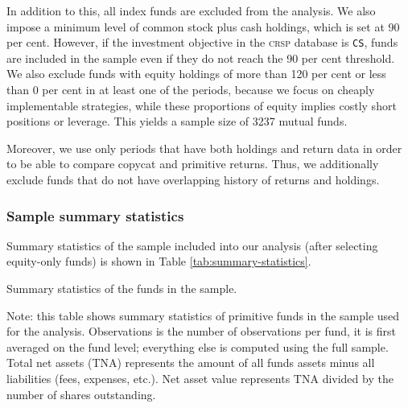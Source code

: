 \documentclass[12pt, a4]{article}
\begin{document}
In addition to this, all index funds are excluded from the analysis. We also impose a minimum level of common stock plus cash holdings, which is set at 90 per cent. However, if the investment objective in the \textsc{crsp} database is \texttt{CS}, funds are included in the sample even if they do not reach the 90 per cent threshold. We also exclude funds with equity holdings of more than 120 per cent or less than 0 per cent in at least one of the periods, because we focus on cheaply implementable strategies, while these proportions of equity implies costly short positions or leverage. This yields a sample size of 3237 mutual funds.

Moreover, we use only periods that have both holdings and return data in order to be able to compare copycat and primitive returns. Thus, we additionally exclude funds that do not have overlapping history of returns and holdings.

\subsubsection*{Sample summary statistics}\label{sec:sample-summary-statistics}
Summary statistics of the sample included into our analysis (after selecting equity-only funds) is shown in Table \ref{tab:summary-statistics}.

\begin{table}
	\centering
	\footnotesize
	\begin{threeparttable}
		\caption{Summary statistics of the funds in the sample.}
		\label{tab:summary-statistics}

        

		\begin{tablenotes}
			\scriptsize
			\item Note: this table shows summary statistics of primitive funds in the sample used for the analysis. Observations is the number of observations per fund, it is first averaged on the fund level; everything else is computed using the full sample. Total net assets (\textsc{TNA}) represents the amount of all funds assets minus all liabilities (fees, expenses, etc.). Net asset value represents \textsc{TNA} divided by the number of shares outstanding.
		\end{tablenotes}
	\end{threeparttable}
\end{table}
\end{document}
